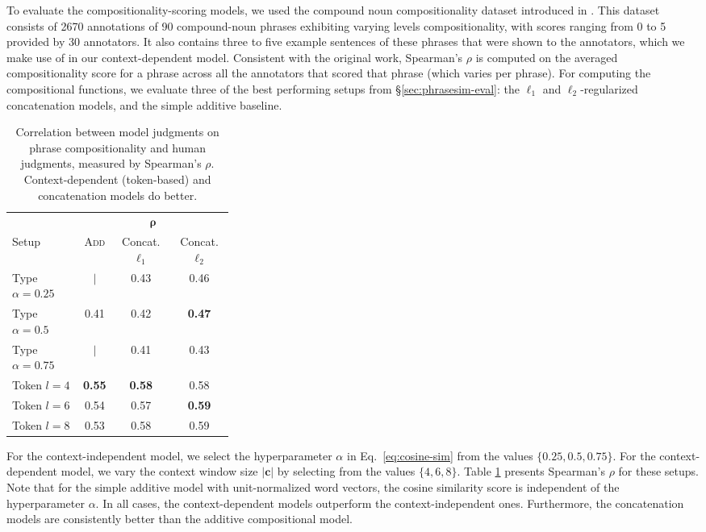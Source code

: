 \documentclass[11pt,letterpaper]{article}
\begin{document}
To evaluate the compositionality-scoring models, we used the compound noun compositionality dataset introduced in .  
This dataset consists of 2670 annotations of 90 compound-noun phrases exhibiting varying levels compositionality, with scores ranging from 0 to 5 provided by 30 annotators. 
It also contains three to five example sentences of these phrases that were shown to the annotators, which we make use of in our context-dependent model. 
Consistent with the original work, Spearman's $\rho$ is computed on the averaged compositionality score for a phrase across all the annotators that scored that phrase (which varies per phrase). 
For computing the compositional functions, we evaluate three of the best performing setups from \S\ref{sec:phrasesim-eval}: the $\ell_1$ and $\ell_2$-regularized concatenation models, and the simple additive baseline. 

\begin{table}[h!]
	\small
  \begin{center}
    \begin{tabular}{p{0.32\linewidth}ccc}
      \hline
      & \multicolumn{3}{c}{$\bm{\rho}$} \\
	  Setup & \textsc{Add} & Concat. $\ell_1$ & Concat. $\ell_2$ \\
	  \hline
      Type $\alpha=0.25$ & $\mid$ & 0.43 & 0.46 \\
	  Type $\alpha=0.5$ &  0.41 & 0.42 & {\bf 0.47} \\
	  Type $\alpha=0.75$ & $\mid$ & 0.41 & 0.43 \\
	  \hline 
	  Token $l=4$ & {\bf 0.55} & {\bf 0.58} & 0.58 \\
      Token $l=6$ & 0.54 & 0.57 & {\bf 0.59} \\
	  Token $l=8$  & 0.53 & 0.58 & 0.59 \\
	\end{tabular}
  \end{center}
  \caption{Correlation between model judgments on phrase compositionality and human judgments, measured by Spearman's $\rho$. Context-dependent (token-based) and concatenation models do better.}
  \label{tab:comp-results}
\end{table}

For the context-independent model, we select the hyperparameter $\alpha$ in Eq.~\ref{eq:cosine-sim} from the values $\{0.25, 0.5, 0.75\}$. 
For the context-dependent model, we vary the context window size $|\boldsymbol{c}|$ by selecting from the values $\{4, 6, 8\}$. 
Table \ref{tab:comp-results} presents Spearman's $\rho$ for these setups. 
Note that for the simple additive model with unit-normalized word vectors, the cosine similarity score is independent of the hyperparameter $\alpha$.
In all cases, the context-dependent models outperform the context-independent ones. 
Furthermore, the concatenation models are consistently better than the additive compositional model. 
\end{document}
